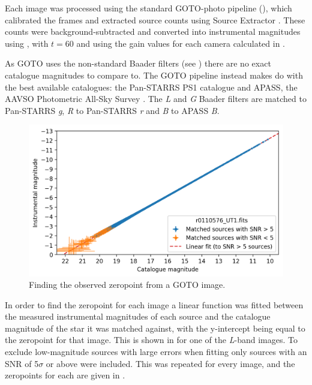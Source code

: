\begin{colsection}
\begin{colsection}
Each image was processed using the standard GOTO-photo pipeline (), which calibrated the frames and extracted source counts using Source Extractor \citep{SE}. These counts were background-subtracted and converted into instrumental magnitudes using , with $t=60$ and using the gain values for each camera calculated in .

As GOTO uses the non-standard Baader filters (see ) there are no exact catalogue magnitudes to compare to. The GOTO pipeline instead makes do with the best available catalogues: the Pan-STARRS PS1 catalogue \citep{Pan-STARRS} and APASS, the AAVSO Photometric All-Sky Survey \citep{APASS}. The \textit{L} and \textit{G} Baader filters are matched to Pan-STARRS \textit{g}, \textit{R} to Pan-STARRS \textit{r} and \textit{B} to APASS \textit{B}.

\begin{figure}[t]
    \begin{center}
        \includegraphics[width=\textwidth]{images/throughput/zeropoint_real.png}
    \end{center}
    \caption[Finding the observed zeropoint from a GOTO image]{
        Finding the observed zeropoint from a GOTO image.
    }\label{fig:zeropoint}
\end{figure}

In order to find the zeropoint for each image a linear function was fitted between the measured instrumental magnitudes of each source and the catalogue magnitude of the star it was matched against, with the y-intercept being equal to the zeropoint for that image. This is shown in  for one of the \textit{L}-band images. To exclude low-magnitude sources with large errors when fitting only sources with an SNR of 5$\sigma$ or above were included. This was repeated for every image, and the zeropoints for each are given in .


\end{colsection}
\end{colsection}
